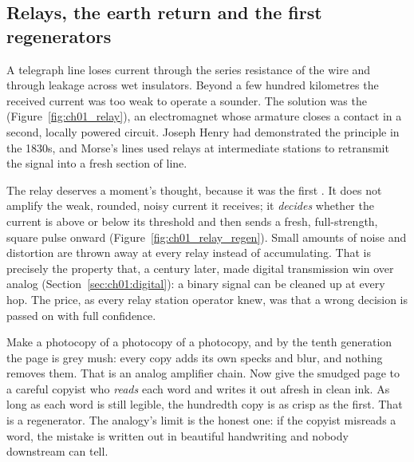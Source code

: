 \subsection{Relays, the earth return and the first regenerators}

A telegraph line loses current through the series resistance of the wire and through leakage across
wet insulators. Beyond a few hundred kilometres the received current was too weak to operate a
sounder. The solution was the  (Figure~\ref{fig:ch01_relay}), an electromagnet whose
armature closes a contact in a
second, locally powered circuit. Joseph Henry had demonstrated the principle in the 1830s, and
Morse's lines used relays at intermediate stations to retransmit the signal into a fresh section of
line.

The relay deserves a moment's thought, because it was the first . It does not
amplify the weak, rounded, noisy current it receives; it \emph{decides} whether the current is above
or below its threshold and then sends a fresh, full-strength, square pulse onward
(Figure~\ref{fig:ch01_relay_regen}). Small amounts of noise and distortion are thrown away at every
relay instead of accumulating. That is precisely the property that, a century later, made digital
transmission win over analog (Section~\ref{sec:ch01:digital}): a binary signal can be cleaned up at
every hop. The price, as every relay station operator knew, was that a wrong decision is passed on
with full confidence.


\begin{analogy}
Make a photocopy of a photocopy of a photocopy, and by the tenth generation the page is grey mush:
every copy adds its own specks and blur, and nothing removes them. That is an analog amplifier
chain. Now give the smudged page to a careful copyist who \emph{reads} each word and writes it out
afresh in clean ink. As long as each word is still legible, the hundredth copy is as crisp as the
first. That is a regenerator. The analogy's limit is the honest one: if the copyist misreads a word,
the mistake is written out in beautiful handwriting and nobody downstream can tell.
\end{analogy}



